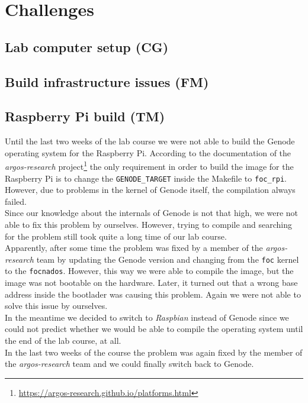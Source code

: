 \section{Challenges}
\label{sec:challenges}


\subsection{Lab computer setup (CG)}


\subsection{Build infrastructure issues (FM)}


\subsection{Raspberry Pi build (TM)}
\label{sec:pi-problems}
Until the last two weeks of the lab course we were not able to build the Genode operating system for the Raspberry Pi. According to the documentation of the \textit{argos-research} project\footnote{\url{https://argos-research.github.io/platforms.html}} the only requirement in order to build the image for the Raspberry Pi is to change the \texttt{GENODE\_TARGET} inside the Makefile to \texttt{foc\_rpi}. However, due to problems in the kernel of Genode itself, the compilation always failed. \\

Since our knowledge about the internals of Genode is not that high, we were not able to fix this problem by ourselves. However, trying to compile and searching for the problem still took quite a long time of our lab course. \\

Apparently, after some time the problem was fixed by a member of the \textit{argos-research} team by updating the Genode version and changing from the \texttt{foc} kernel to the \texttt{focnados}. However, this way we were able to compile the image, but the image was not bootable on the hardware. Later, it turned out that a wrong base address inside the bootlader was causing this problem. Again we were not able to solve this issue by ourselves. \\

In the meantime we decided to switch to \textit{Raspbian} instead of Genode since we could not predict whether we would be able to compile the operating system until the end of the lab course, at all. \\

In the last two weeks of the course the problem was again fixed by the member of the \textit{argos-research} team and we could finally switch back to Genode.
